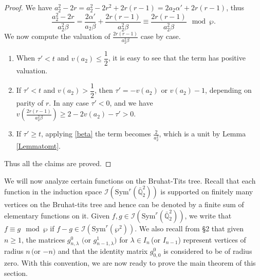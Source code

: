 \documentclass[11pt, reqno]{amsart}
\numberwithin{equation}{section}
\newcommand\Q{\mathbb{Q}}
\newcommand\Sym{{\mathrm {Sym}}}
\theoremstyle{definition}
\theoremstyle{remark}
\theoremstyle{definition}
\theoremstyle{remark}
\theoremstyle{remark}
\begin{document}
\begin{proof}
We have $a_{2}^2-2r = a_{2}^2-2r^2 + 2r(r-1)
     =2a_{2}\alpha'+2r(r-1)$, thus
$$\dfrac{a_{2}^2-2r}{a_{2}^2\beta} = \dfrac{2\alpha'}{a_{2}\beta} + \dfrac{2r(r-1)}{a_{2}^2\beta}\equiv\dfrac{2r(r-1)}{a_{2}^2\beta}\mod\wp.$$
We now compute the valuation of $\frac{2r(r-1)}{a_{2}^2\beta}$  case by case. 
     \begin{enumerate}
         \item When $\tau'<t$ and $v(a_{2})\leq \dfrac{1}{2}$, it is easy to see that the term has positive valuation.
         \item If $\tau'<t$ and $v(a_{2})>\dfrac{1}{2}$, then  $\tau'=-v(a_{2})$ or $v(a_2)-1$, depending on parity of $r$. In any case $\tau'<0$, and we have $v\left(\frac{2r(r-1)}{a_{2}^2\beta}\right)\geq 2-2v(a_2)-\tau'>0$. %
         \item If $\tau'\geq t$, applying \eqref{beta} the term becomes $\frac{2}{a_{2}^2}$, which is a unit by Lemma \ref{Lemmatomt}. 
             \end{enumerate}
    Thus all the claims are proved.         
\end{proof}
We will now analyze certain functions on the Bruhat-Tits tree. Recall that each function in the induction space $\mathcal{I}(\Sym^{r}(\bar{\mathbb{{Q}}}^{2}_{2}))$ is supported on finitely many vertices on the Bruhat-tits tree and hence can be denoted by a finite sum of elementary functions on it. 
Given $f,g \in \mathcal{I}(\Sym^{r}(\bar{\mathbb{{Q}}}^{2}_{2}))$, we write that $f \equiv g \mod \wp$ if $f-g \in \mathcal{I}(\Sym^{r}(\wp^{2}))$. We also recall from \S 2 that given $n\geq 1$, the matrices $g_{n,\lambda}^{0}$ $($or $ g_{n-1,\lambda}^{1})$ for $\lambda \in I_{n}$\,(or $I_{n-1}$) represent vertices of radius $n\,($or $-n)$ and that the identity matrix $g_{0,0}^{0}$ is considered to be of radius zero. With this convention, we are now ready to prove the main theorem of this section.   
\end{document}
